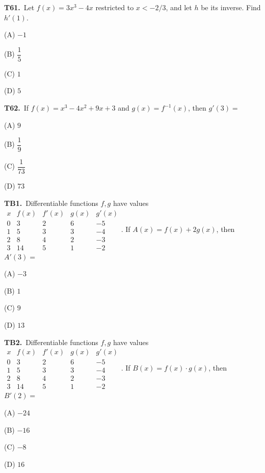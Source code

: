 \documentclass[11pt]{article}
\begin{document}
\bigskip\noindent\textbf{T61.}\ Let $f(x)=3x^3-4x$ restricted to $x<-2/3$, and let $h$ be its inverse. Find $h\prime(1)$.
\begin{list}{}{\setlength{\leftmargin}{3em}\setlength{\labelwidth}{2.5em}\setlength{\itemsep}{0pt}\setlength{\topsep}{2pt}}
\item[(A)] $-1$
\item[(B)] $\dfrac{1}{5}$
\item[(C)] $1$
\item[(D)] $5$
\end{list}

\bigskip\noindent\textbf{T62.}\ If $f(x) = x^3-4x^2+9x+3$ and $g(x) = f^{-1}(x)$, then $g'(3) =$
\begin{list}{}{\setlength{\leftmargin}{3em}\setlength{\labelwidth}{2.5em}\setlength{\itemsep}{0pt}\setlength{\topsep}{2pt}}
\item[(A)] $9$
\item[(B)] $\dfrac{1}{9}$
\item[(C)] $\dfrac{1}{73}$
\item[(D)] $73$
\end{list}

\bigskip\noindent\textbf{TB1.}\ Differentiable functions $f,g$ have values $\begin{array}{c|rrrr}x&f(x)&f\prime(x)&g(x)&g\prime(x)\\0&3&2&6&-5\\1&5&3&3&-4\\2&8&4&2&-3\\3&14&5&1&-2\end{array}$. If $A(x) = f(x) + 2g(x)$, then $A'(3) =$
\begin{list}{}{\setlength{\leftmargin}{3em}\setlength{\labelwidth}{2.5em}\setlength{\itemsep}{0pt}\setlength{\topsep}{2pt}}
\item[(A)] $-3$
\item[(B)] $1$
\item[(C)] $9$
\item[(D)] $13$
\end{list}

\bigskip\noindent\textbf{TB2.}\ Differentiable functions $f,g$ have values $\begin{array}{c|rrrr}x&f(x)&f\prime(x)&g(x)&g\prime(x)\\0&3&2&6&-5\\1&5&3&3&-4\\2&8&4&2&-3\\3&14&5&1&-2\end{array}$. If $B(x) = f(x) \cdot g(x)$, then $B'(2) =$
\begin{list}{}{\setlength{\leftmargin}{3em}\setlength{\labelwidth}{2.5em}\setlength{\itemsep}{0pt}\setlength{\topsep}{2pt}}
\item[(A)] $-24$
\item[(B)] $-16$
\item[(C)] $-8$
\item[(D)] $16$
\end{list}
\end{document}
